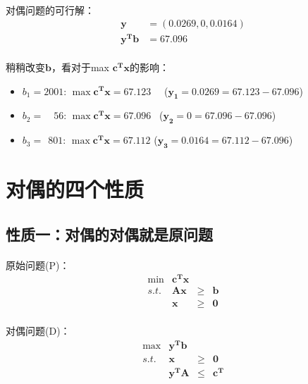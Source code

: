      \paragraph{}对偶问题的可行解：
     	\begin{align*}
     		\mathbf{y}&=(0.0269, 0, 0.0164) \\
			\mathbf{y^Tb}&=67.096  
     	\end{align*}
     \paragraph{}稍稍改变$\bm{b}$，看对于max $\mathbf{c^Tx}$的影响：
     	\begin{itemize}
     		\item $b_1= 2001$: $\max \mathbf{c^Tx}=67.123$ \ \ ($\mathbf{y_1}=0.0269 = 67.123 - 67.096$)
			\item $b_2=\quad 56$: $\max \mathbf{c^Tx}=67.096$ \ ($\mathbf{y_2}=0  = 67.096 - 67.096$)
			\item $b_3=\ \ 801$: $\max \mathbf{c^Tx}=67.112$ ($\mathbf{y_3}=0.0164  = 67.112 - 67.096$)
     	\end{itemize}
     \section{对偶的四个性质}
     \subsection{性质一：对偶的对偶就是原问题}
     \paragraph{}原始问题(P)：
     	\[
		\begin{array}{rrrrrrrrl}
 			\min & \mathbf{c^T x} &  & \\
 			s.t. & \mathbf{A x } & \geq&  \mathbf{b }\\
      		& \mathbf{x} & \geq& \mathbf{0} 
		\end{array} \nonumber
		\]
     \paragraph{}对偶问题(D)：
     	\[
		\begin{array}{rrrrrrrrl}
 			\max & \mathbf{y^T b} &  & \\
 			s.t. & \mathbf{x} & \geq& \mathbf{0} \\
 				 & \mathbf{y^T A } & \leq&  \mathbf{c^T }
		\end{array} \nonumber
		\]
